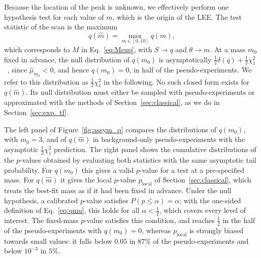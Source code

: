 Because the location of the peak is unknown, we effectively perform one hypothesis test for each value of $m$, which is the origin of the LEE. The test statistic of the scan is the maximum
\begin{equation}
  q(\hat m)=\max_{m\in[0,10]} q(m),
\end{equation}
which corresponds to $M$ in Eq.~\eqref{eq:Msup}, with $S\to q$ and $\theta\to m$. At a mass $m_0$ fixed in advance, the null distribution of $q(m_0)$ is asymptotically $\tfrac12\delta(q)+\tfrac12\chi^2_1$~\cite{Cowan:2010js}, since $\hat\mu_{m_0}<0$, and hence $q(m_0)=0$, in half of the pseudo-experiments. We refer to this distribution as $\tfrac12\chi^2_1$ in the following. No such closed form exists for $q(\hat m)$. Its null distribution must either be sampled with pseudo-experiments or approximated with the methods of Section~\ref{sec:classical}, as we do in Section~\ref{sec:exp_tf}.

The left panel of Figure~\ref{fig:assym_q} compares the distributions of $q(m_0)$, with $m_0=3$, and of $q(\hat m)$ in background-only pseudo-experiments with the asymptotic $\tfrac12\chi^2_1$ prediction. The right panel shows the cumulative distributions of the $p$-values obtained by evaluating both statistics with the same asymptotic tail probability. For $q(m_0)$ this gives a valid $p$-value for a test at a pre-specified mass. For $q(\hat m)$ it gives the local $p$-value $p_\text{local}$ of Section~\ref{sec:classical}, which treats the best-fit mass as if it had been fixed in advance. Under the null hypothesis, a calibrated $p$-value satisfies $P(p\leq\alpha)=\alpha$; with the one-sided definition of Eq.~\eqref{eq:qmu}, this holds for all $\alpha<\tfrac12$, which covers every level of interest. The fixed-mass $p$-value satisfies this condition, and reaches $\tfrac12$ in the half of the pseudo-experiments with $q(m_0)=0$, whereas $p_\text{local}$ is strongly biased towards small values: it falls below $0.05$ in $87\%$ of the pseudo-experiments and below $10^{-3}$ in $5\%$.

